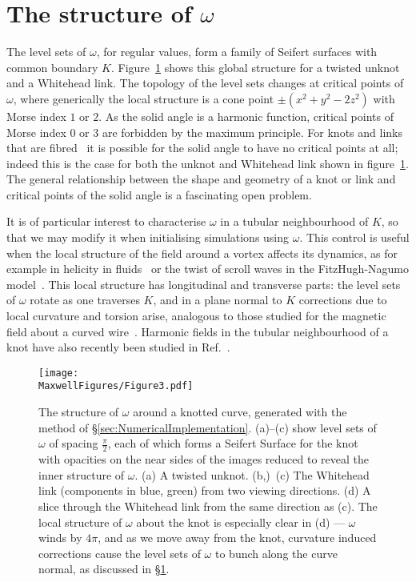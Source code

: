     \section{The structure of $\omega$}
    \label{sec:LocalStructure}

    The level sets of $\omega$, for regular values, form a family of Seifert surfaces with common boundary $K$. Figure~\ref{fig:SolidAngle} shows this global structure for a twisted unknot and a Whitehead link. 
    The topology of the level sets changes at critical points of $\omega$, where generically the local structure is a cone point $\pm(x^2+y^2-2z^2)$ with Morse index $1$ or $2$. As the solid angle is a harmonic function, critical points of Morse index $0$ or $3$ are forbidden by the maximum principle. For knots and links that are fibred~\citep{Stallings1978} it is possible for the solid angle to have no critical points at all; indeed this is the case for both the unknot and Whitehead link shown in figure~\ref{fig:SolidAngle}. The general relationship between the shape and geometry of a knot or link and critical points of the solid angle is a fascinating open problem. 

    It is of particular interest to characterise $\omega$ in a tubular neighbourhood of $K$, so that we may modify it when initialising simulations using $\omega$. This control is useful when the local structure of the field around a vortex affects its dynamics, as for example in helicity in fluids~\citep{Moffat1992} or the twist of scroll waves in the FitzHugh-Nagumo model~\citep{Winfree1984,Maucher2018}. This local structure has longitudinal and transverse parts: the level sets of $\omega$ rotate as one traverses $K$, and in a plane normal to $K$ corrections due to local curvature and torsion arise, analogous to those studied for the magnetic field about a curved wire~\citep{Saffman1992}. Harmonic fields in the tubular neighbourhood of a knot have also recently been studied in Ref.~\citep{Duan2018}. 

    \begin{figure}[htbp]
        \begin{centering}
            \texttt{[image: \\MaxwellFigures/Figure3.pdf]}
            \caption[The structure of solid angle around a knotted curve.]{The structure of $\omega$ around a knotted curve, generated with the method of \S\ref{sec:NumericalImplementation}. (a)--(c) show level sets of $\omega$ of spacing $\frac{\pi}{2}$, each of which forms a Seifert Surface for the knot with opacities on the near sides of the images reduced to reveal the inner structure of $\omega$. (a) A twisted unknot. (b,)~(c) The Whitehead link (components in blue, green) from two viewing directions. (d) A slice through the Whitehead link from the same direction as (c). The local structure of $\omega$ about the knot is especially clear in (d) --- $\omega$ winds by $4 \pi$, and as we move away from the knot, curvature induced corrections cause the level sets of $\omega$ to bunch along the curve normal, as discussed in \S\ref{sec:LocalStructure}.}
            \label{fig:SolidAngle}
        \end{centering}
    \end{figure}

